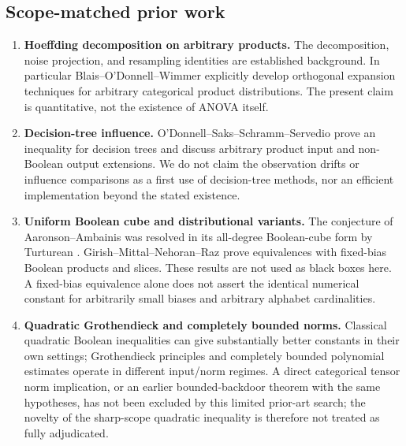 \documentclass[11pt,letterpaper]{article}
\theoremstyle{definition}
\begin{document}
\subsection{Scope-matched prior work}
\begin{enumerate}[label=\textnormal{(\roman*)}]
\item \textbf{Hoeffding decomposition on arbitrary products.}
The decomposition, noise projection, and resampling identities are
established background. In particular Blais--O'Donnell--Wimmer
\cite{BOW2008} explicitly develop orthogonal expansion techniques
for arbitrary categorical product distributions. The present
claim is quantitative, not the existence of ANOVA itself.
\item \textbf{Decision-tree influence.}
O'Donnell--Saks--Schramm--Servedio \cite{OSSS2005} prove an inequality
for decision trees and discuss arbitrary product input and
non-Boolean output extensions. We do not claim the observation
drifts or influence comparisons as a first use of decision-tree
methods, nor an efficient implementation beyond the stated existence.
\item \textbf{Uniform Boolean cube and distributional variants.}
The conjecture of Aaronson--Ambainis \cite{AA2014} was resolved in
its all-degree Boolean-cube form by Turturean
\cite{Turturean2026}. Girish--Mittal--Nehoran--Raz \cite{GMNR2026}
prove equivalences with fixed-bias Boolean products and slices. These
results are not used as black boxes here. A fixed-bias equivalence
alone does not assert the identical numerical constant for
arbitrarily small biases and arbitrary alphabet cardinalities.
\item \textbf{Quadratic Grothendieck and completely bounded norms.}
Classical quadratic Boolean inequalities can give substantially
better constants in their own settings; Grothendieck principles and
completely bounded polynomial estimates \cite{EG2023,EGSP2026}
operate in different input/norm regimes. A direct categorical tensor
norm implication, or an earlier bounded-backdoor theorem with the
same hypotheses, has not been excluded by this limited prior-art
search; the novelty of the sharp-scope quadratic inequality is
therefore not treated as fully adjudicated.
\end{enumerate}
\end{document}

